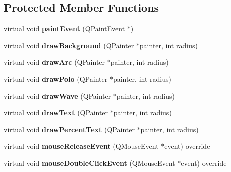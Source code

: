 \subsection*{Protected Member Functions}
\begin{DoxyCompactItemize}
\item 
\mbox{\label{class_q_qt_custom_progress_bar_ad02542cfbdd6918c3a94e24f6db9cef9}} 
virtual void {\bfseries paint\+Event} (Q\+Paint\+Event $\ast$)
\item 
\mbox{\label{class_q_qt_custom_progress_bar_a5d8f8c54558bb882b51b1dab1b349101}} 
virtual void {\bfseries draw\+Background} (Q\+Painter $\ast$painter, int radius)
\item 
\mbox{\label{class_q_qt_custom_progress_bar_a93206e5932bddf2c58299f969cdc020a}} 
virtual void {\bfseries draw\+Arc} (Q\+Painter $\ast$painter, int radius)
\item 
\mbox{\label{class_q_qt_custom_progress_bar_a47d672a64f6cfa660b2867e8be3487fc}} 
virtual void {\bfseries draw\+Polo} (Q\+Painter $\ast$painter, int radius)
\item 
\mbox{\label{class_q_qt_custom_progress_bar_a0993c00088723a6e8f947e42708df004}} 
virtual void {\bfseries draw\+Wave} (Q\+Painter $\ast$painter, int radius)
\item 
\mbox{\label{class_q_qt_custom_progress_bar_a5ba7af80a056dd75c508169a49480ed9}} 
virtual void {\bfseries draw\+Text} (Q\+Painter $\ast$painter, int radius)
\item 
\mbox{\label{class_q_qt_custom_progress_bar_a353fbee161e6f6be365d6ce9b468a885}} 
virtual void {\bfseries draw\+Percent\+Text} (Q\+Painter $\ast$painter, int radius)
\item 
\mbox{\label{class_q_qt_custom_progress_bar_aaa5525cd01339fa662702a7276619cf4}} 
virtual void {\bfseries mouse\+Release\+Event} (Q\+Mouse\+Event $\ast$event) override
\item 
\mbox{\label{class_q_qt_custom_progress_bar_ac96a14a8720b194dd861ef3c1eaa8fb2}} 
virtual void {\bfseries mouse\+Double\+Click\+Event} (Q\+Mouse\+Event $\ast$event) override
\end{DoxyCompactItemize}
